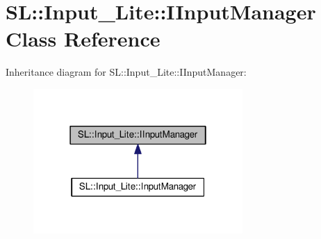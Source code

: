 \hypertarget{class_s_l_1_1_input___lite_1_1_i_input_manager}{}\section{SL\+:\+:Input\+\_\+\+Lite\+:\+:I\+Input\+Manager Class Reference}
\label{class_s_l_1_1_input___lite_1_1_i_input_manager}


Inheritance diagram for SL\+:\+:Input\+\_\+\+Lite\+:\+:I\+Input\+Manager\+:\nopagebreak
\begin{figure}[H]
\begin{center}
\leavevmode
\includegraphics[width=226pt]{class_s_l_1_1_input___lite_1_1_i_input_manager__inherit__graph}
\end{center}
\end{figure}
